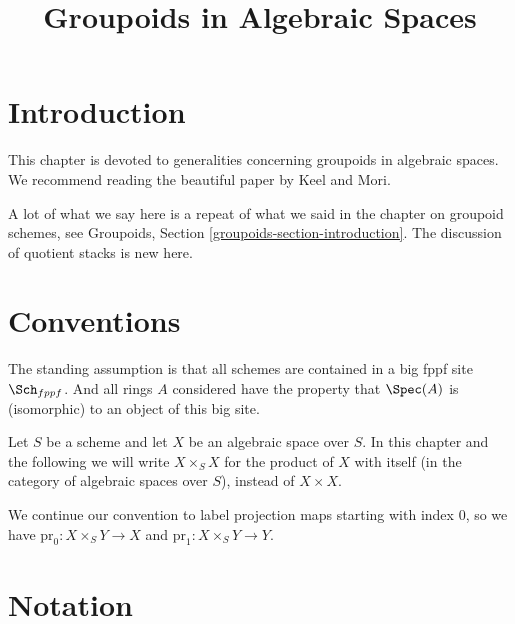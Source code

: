 

%


\title{Groupoids in Algebraic Spaces}


\maketitle

\label{section-phantom}

\tableofcontents

\section{Introduction}
\label{section-introduction}

\noindent
This chapter is devoted to generalities concerning groupoids in algebraic
spaces. We recommend reading the beautiful paper \cite{K-M} by Keel and Mori.

\medskip\noindent
A lot of what we say here is a repeat of what we said in the chapter
on groupoid schemes, see
Groupoids, Section \ref{groupoids-section-introduction}.
The discussion of quotient stacks is new here.


\section{Conventions}
\label{section-conventions}

\noindent
The standing assumption is that all schemes are contained in
a big fppf site $\Sch_{fppf}$. And all rings $A$ considered
have the property that $\Spec(A)$ is (isomorphic) to an
object of this big site.

\medskip\noindent
Let $S$ be a scheme and let $X$ be an algebraic space over $S$.
In this chapter and the following we will write $X \times_S X$
for the product of $X$ with itself (in the category of algebraic
spaces over $S$), instead of $X \times X$.

\medskip\noindent
We continue our convention to label projection maps starting with
index $0$, so we have $\text{pr}_0 : X \times_S Y \to X$ and
$\text{pr}_1 : X \times_S Y \to Y$.




\section{Notation}
\label{section-notation}

